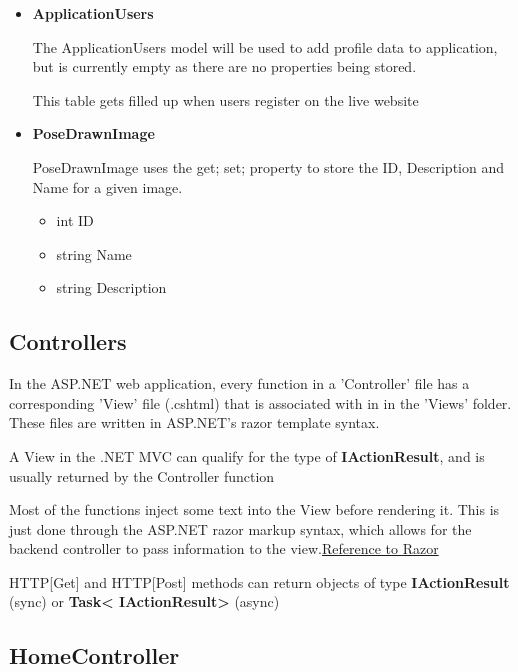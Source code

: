\documentclass{scrreprt}
\begin{document}
\begin{itemize}
        \item \textbf{ApplicationUsers}

                The ApplicationUsers model will be used to add profile data to
                application, but is currently empty as there are no properties
                being stored.

                This table gets filled up when users register on the live website

        \item \textbf{PoseDrawnImage}

                PoseDrawnImage uses the {get; set;} property to store the ID, Description
                and Name for a given image.

                \begin{itemize}
                        \item int ID
                        \item string Name
                        \item string Description
                \end{itemize}

\end{itemize}

\subsection{Controllers}

In the ASP.NET web application, every function in a 'Controller' file has a
corresponding 'View' file (.cshtml) that is associated with in in the 'Views'
folder. These files are written in ASP.NET's razor template syntax.

A View in the .NET MVC can qualify for the type of \textbf{IActionResult}, and
is usually returned by the Controller function

Most of the functions inject some text into the View before rendering it. This
is just done through the ASP.NET razor markup syntax, which allows for the
backend controller to pass information to the
view.\href{https://docs.microsoft.com/en-us/aspnet/core/mvc/views/razor}
{Reference to Razor}

HTTP[Get] and HTTP[Post] methods can return objects of type
\textbf{IActionResult} (sync) or \textbf{Task\textless
IActionResult\textgreater} (async)

\subsection{HomeController}
\end{document}
